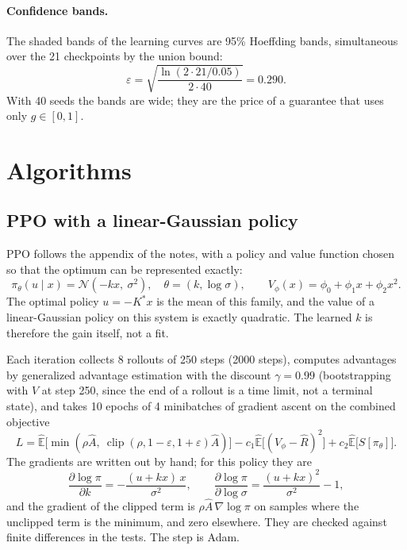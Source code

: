 \documentclass[11pt]{article}
\begin{document}
\paragraph{Confidence bands.} The shaded bands of the learning curves are 95\% Hoeffding bands,
simultaneous over the 21 checkpoints by the union bound:
\[
  \varepsilon = \sqrt{\frac{\ln(2 \cdot 21 / 0.05)}{2 \cdot 40}} = 0.290 .
\]
With 40 seeds the bands are wide; they are the price of a guarantee that uses only $g \in [0, 1]$.

\section{Algorithms}
\label{sec:algorithms}

\subsection{PPO with a linear-Gaussian policy}

PPO follows the appendix of the notes, with a policy and value function chosen so that the optimum
can be represented exactly:
\[
  \pi_\theta(u \mid x) = \mathcal{N}(-kx,\ \sigma^2), \quad \theta = (k, \log \sigma), \qquad
  V_\phi(x) = \phi_0 + \phi_1 x + \phi_2 x^2 .
\]
The optimal policy $u = -K^* x$ is the mean of this family, and the value of a linear-Gaussian
policy on this system is exactly quadratic. The learned $k$ is therefore the gain itself, not a fit.

Each iteration collects 8 rollouts of 250 steps (2000 steps), computes advantages by generalized
advantage estimation with the discount $\gamma = 0.99$ (bootstrapping with $V$ at step 250, since
the end of a rollout is a time limit, not a terminal state), and takes 10 epochs of 4 minibatches
of gradient ascent on the combined objective
\[
  L = \hat{\mathbb{E}}\big[\min(\rho \hat A,\ \operatorname{clip}(\rho, 1-\varepsilon, 1+\varepsilon)\hat A)\big]
  - c_1 \hat{\mathbb{E}}\big[(V_\phi - \hat R)^2\big] + c_2 \hat{\mathbb{E}}\big[S[\pi_\theta]\big].
\]
The gradients are written out by hand; for this policy they are
\[
  \frac{\partial \log \pi}{\partial k} = -\frac{(u + kx)\,x}{\sigma^2}, \qquad
  \frac{\partial \log \pi}{\partial \log \sigma} = \frac{(u + kx)^2}{\sigma^2} - 1,
\]
and the gradient of the clipped term is $\rho \hat A\, \nabla \log \pi$ on samples where the
unclipped term is the minimum, and zero elsewhere. They are checked against finite differences in
the tests. The step is Adam.
\end{document}
